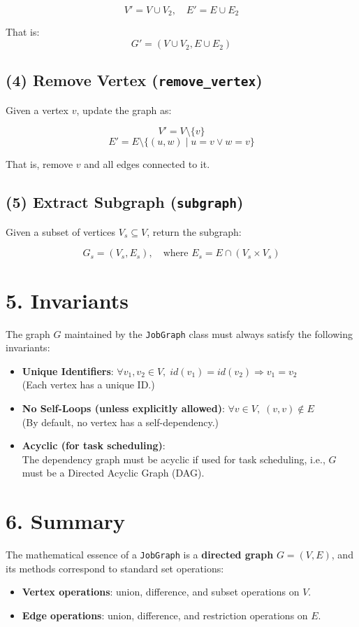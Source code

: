 \documentclass{article}
\begin{document}
\[
V' = V \cup V_2,\quad E' = E \cup E_2
\]

That is:
\[
G' = (V \cup V_2, E \cup E_2)
\]

\subsection*{(4) Remove Vertex (\texttt{remove\_vertex})}

Given a vertex $v$, update the graph as:

\[
V' = V \setminus \{v\}
\]
\[
E' = E \setminus \{(u, w) \mid u = v \lor w = v \}
\]

That is, remove $v$ and all edges connected to it.

\subsection*{(5) Extract Subgraph (\texttt{subgraph})}

Given a subset of vertices $V_s \subseteq V$, return the subgraph:

\[
G_s = (V_s, E_s), \quad \text{where } E_s = E \cap (V_s \times V_s)
\]

\section*{5. Invariants}

The graph $G$ maintained by the \texttt{JobGraph} class must always satisfy the following invariants:

\begin{itemize}
    \item \textbf{Unique Identifiers}: $\forall v_1, v_2 \in V,\; id(v_1) = id(v_2) \Rightarrow v_1 = v_2$ \\
    (Each vertex has a unique ID.)
    
    \item \textbf{No Self-Loops (unless explicitly allowed)}: $\forall v \in V,\; (v, v) \notin E$ \\
    (By default, no vertex has a self-dependency.)

    \item \textbf{Acyclic (for task scheduling)}: \\
    The dependency graph must be acyclic if used for task scheduling, i.e., $G$ must be a Directed Acyclic Graph (DAG).
\end{itemize}

\section*{6. Summary}

The mathematical essence of a \texttt{JobGraph} is a \textbf{directed graph} $G = (V, E)$, and its methods correspond to standard set operations:

\begin{itemize}
    \item \textbf{Vertex operations}: union, difference, and subset operations on $V$.
    \item \textbf{Edge operations}: union, difference, and restriction operations on $E$.
\end{itemize}
\end{document}
